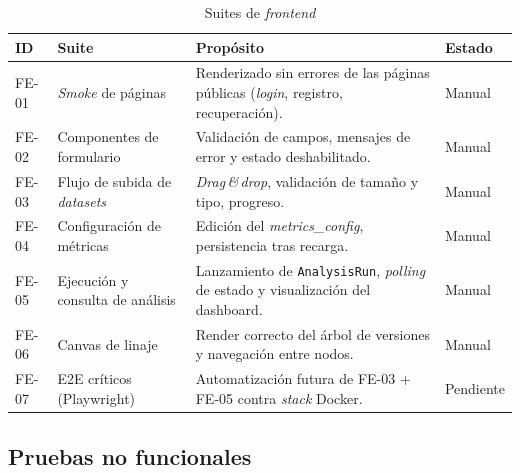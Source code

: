\begin{table}[H]
  \centering
  \small
  \caption{Suites de \emph{frontend}}
  \label{tab:suites-frontend}
  \begin{tabularx}{\textwidth}{l >{\hsize=0.7\hsize}X >{\hsize=1.3\hsize}X l}
    \toprule
    \textbf{ID} & \textbf{Suite} & \textbf{Propósito} & \textbf{Estado} \\
    \midrule
    FE-01 & \emph{Smoke} de páginas &
      Renderizado sin errores de las páginas públicas (\emph{login},
      registro, recuperación).
      & Manual \\
    FE-02 & Componentes de formulario &
      Validación de campos, mensajes de error y estado deshabilitado.
      & Manual \\
    FE-03 & Flujo de subida de \emph{datasets} &
      \emph{Drag\,\&\,drop}, validación de tamaño y tipo, progreso.
      & Manual \\
    FE-04 & Configuración de métricas &
      Edición del \emph{metrics\_config}, persistencia tras recarga.
      & Manual \\
    FE-05 & Ejecución y consulta de análisis &
      Lanzamiento de \texttt{AnalysisRun}, \emph{polling} de estado y
      visualización del dashboard.
      & Manual \\
    FE-06 & Canvas de linaje &
      Render correcto del árbol de versiones y navegación entre nodos.
      & Manual \\
    FE-07 & E2E críticos (Playwright) &
      Automatización futura de FE-03 + FE-05 contra \emph{stack} Docker.
      & Pendiente \\
    \bottomrule
  \end{tabularx}
\end{table}

\subsection{Pruebas no funcionales}


